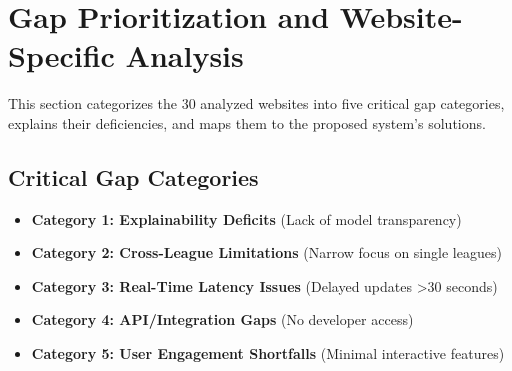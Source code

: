 \section{Gap Prioritization and Website-Specific Analysis}
This section categorizes the 30 analyzed websites into five critical gap categories, explains their deficiencies, and maps them to the proposed system’s solutions.

\subsection{Critical Gap Categories}
\begin{itemize}
\item \textbf{Category 1: Explainability Deficits} (Lack of model transparency)
\item \textbf{Category 2: Cross-League Limitations} (Narrow focus on single leagues)
\item \textbf{Category 3: Real-Time Latency Issues} (Delayed updates >30 seconds)
\item \textbf{Category 4: API/Integration Gaps} (No developer access)
\item \textbf{Category 5: User Engagement Shortfalls} (Minimal interactive features)
\end{itemize}

